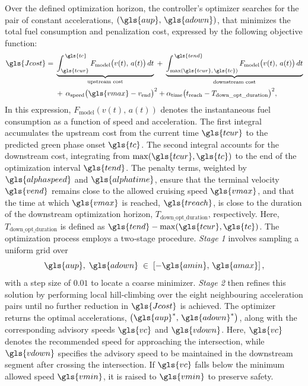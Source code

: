 \mynewline
Over the defined optimization horizon, the controller’s optimizer searches for the pair of constant accelerations, $(\gls{aup},\,\gls{adown})$, that minimizes the total fuel consumption and penalization cost, expressed by the following objective function:
\begin{equation}
\begin{aligned}
   \gls{Jcost} =\;
   &\underbrace{\int_{\gls{tcur}}^{\,\gls{tc}} F_{\mathrm{model}}\bigl(v(t),\,a(t)\bigr)\,dt}_{\text{upstream cost}}
   \;+\;
   \underbrace{\int_{\max(\gls{tcur},\,\gls{tc})}^{\,\gls{tend}} F_{\mathrm{model}}\bigl(v(t),\,a(t)\bigr)\,dt}_{\text{downstream cost}} \\
   &+\, \alpha_{\mathrm{speed}}\bigl(\gls{vmax} - v_{\mathrm{end}}\bigr)^2
   + \alpha_{\mathrm{time}}\bigl(t_{\mathrm{reach}} - T_{\text{down\_opt\_duration}}\bigr)^2,
\end{aligned}
\label{eq:costJ_highlevel}
\end{equation}
In this expression, $F_{\mathrm{model}}(v(t),\,a(t))$ denotes the instantaneous fuel consumption as a function of speed and acceleration. The first integral accumulates the upstream cost from the current time $\gls{tcur}$ to the predicted green phase onset $\gls{tc}$. The second integral accounts for the downstream cost, integrating from $\max(\gls{tcur}, \gls{tc})$ to the end of the optimization interval $\gls{tend}$. The penalty terms, weighted by $\gls{alphaspeed}$ and $\gls{alphatime}$, ensure that the terminal velocity $\gls{vend}$ remains close to the allowed cruising speed $\gls{vmax}$, and that the time at which $\gls{vmax}$ is reached, $\gls{treach}$, is close to the duration of the downstream optimization horizon, $T_{\text{down\_opt\_duration}}$, respectively. Here, $T_{\text{down\_opt\_duration}}$ is defined as $\gls{tend} - \max(\gls{tcur}, \gls{tc})$.
\mynewline
The optimization process employs a two‐stage procedure. \textit{Stage 1} involves sampling a uniform grid over
\begin{equation}
   \gls{aup},\;\gls{adown} \;\in\; \left[-\gls{amin},\,\gls{amax}\right],
\end{equation}
with a step size of $0.01$ to locate a coarse minimizer. \textit{Stage 2} then refines this solution by performing local hill‐climbing over the eight neighbouring acceleration pairs until no further reduction in $\gls{Jcost}$ is achieved. The optimizer returns the optimal accelerations, $\left(\gls{aup}^*,\,\gls{adown}^*\right)$, along with the corresponding advisory speeds $\gls{vc}$ and $\gls{vdown}$. Here, $\gls{vc}$ denotes the recommended speed for approaching the intersection, while $\gls{vdown}$ specifies the advisory speed to be maintained in the downstream segment after crossing the intersection. If $\gls{vc}$ falls below the minimum allowed speed $\gls{vmin}$, it is raised to $\gls{vmin}$ to preserve safety.

